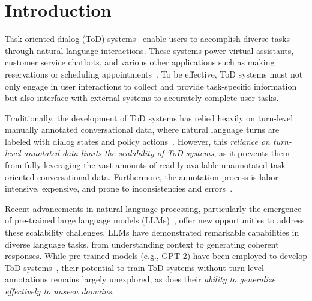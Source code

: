 \section{Introduction}


Task-oriented dialog (ToD) systems~\cite{zhang2020task} enable users to accomplish diverse tasks through natural language interactions. These systems power virtual assistants, customer service chatbots, and various other applications such as making reservations or scheduling appointments~\cite{Williams2016TheDS, Zhang2019TaskOrientedDS}. 
To be effective, ToD systems must not only engage in user interactions to collect and provide task-specific information but also interface with external systems to accurately complete user tasks.


Traditionally, the development of ToD systems has relied heavily on turn-level manually annotated conversational data, where natural language turns are labeled with dialog states and policy actions~\cite{Zhang2020RecentAA}. However, this \emph{reliance on turn-level annotated data limits the scalability of ToD systems}, as it prevents them from fully leveraging the vast amounts of readily available unannotated task-oriented conversational data. Furthermore, the annotation process is labor-intensive, expensive, and prone to inconsistencies and errors~\cite{eric2020multiwoz,zang2020multiwoz,han2021multiwoz,budzianowski2019challenges}.


Recent advancements in natural language processing, particularly the emergence of pre-trained large language models (LLMs)~\cite{vaswani2017attention,devlin2019bert,radford2019language}, offer new opportunities to address these scalability challenges. LLMs have demonstrated remarkable capabilities in diverse language tasks, from understanding context to generating coherent responses. 
While pre-trained models (e.g., GPT-2) have been employed to develop ToD systems~\cite{hosseini2020simple,Yang2020UBARTF,Mosharrof2023ZeroShotGE,budzianowski2018towards}, their potential to train ToD systems without turn-level annotations remains largely unexplored, as does their \emph{ability to generalize effectively to unseen domains}. %



